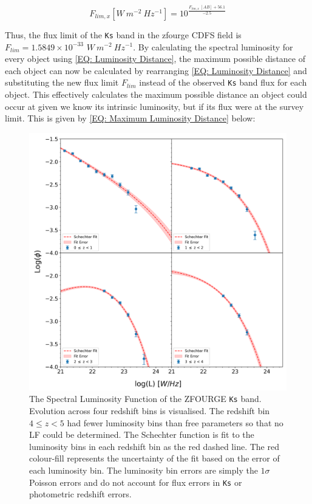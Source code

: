 \begin{equation}
    F_{lim,x} [W\ m^{-2}\ Hz^{-1}] = 10^{\frac{F_{lim,x}\ [AB] + 56.1}{-2.5}}
    \label{EQ: Flux limit from AB}
\end{equation}

Thus, the flux limit of the \texttt{Ks} band in the \gls{zfourge} CDFS field is $F_{lim}=1.5849\times10^{-33}$ $W\ m^{-2}\ Hz^{-1}$. By calculating the spectral luminosity for every object using \cref{EQ: Luminosity Distance}, the maximum possible distance of each object can now be calculated by rearranging \cref{EQ: Luminosity Distance} and substituting the new flux limit $F_{lim}$ instead of the observed \texttt{Ks} band flux for each object. This effectively calculates the maximum possible distance an object could occur at given we know its intrinsic luminosity, but if its flux were at the survey limit. This is given by \cref{EQ: Maximum Luminosity Distance} below:

\begin{figure}[t!]
    \centering
    \includegraphics[width=\linewidth]{Figures/Spectral Luminosity Function.png}
    \caption{The Spectral Luminosity Function of the ZFOURGE \texttt{Ks} band. Evolution across four redshift bins is visualised. The redshift bin $4\leq z<5$ had fewer luminosity bins than free parameters so that no LF could be determined. The Schechter function is fit to the luminosity bins in each redshift bin as the red dashed line. The red colour-fill represents the uncertainty of the fit based on the error of each luminosity bin. The luminosity bin errors are simply the $1\sigma$ Poisson errors and do not account for flux errors in \texttt{Ks} or photometric redshift errors.}
    \label{Fig: Spectral Luminosity Function}
\end{figure}

